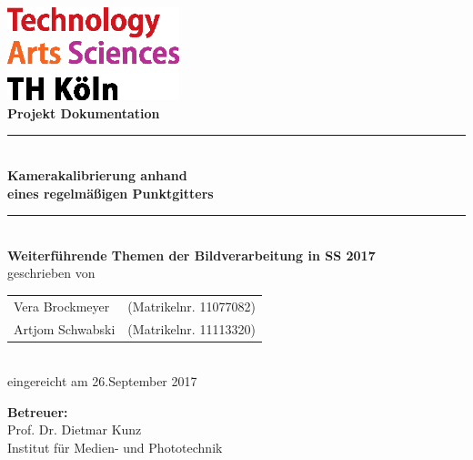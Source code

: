 \thispagestyle{empty}
\begin{center}
	\includegraphics[width=5cm]{Images/logo_TH}\\[12ex]
	{\Huge\textbf{Projekt Dokumentation}}\\[8ex]
	\rule{.8\textwidth}{.2pt}
	{\Large\\[1ex] \textbf{Kamerakalibrierung anhand \\ eines regelmäßigen Punktgitters }}\\
	\rule{.8\textwidth}{.2pt}\\[2ex]
	\textbf{Weiterführende Themen der Bildverarbeitung in SS 2017}\\[10ex]
	geschrieben von\\[2ex]
	\begin{tabular}{ll}
		Vera Brockmeyer &(Matrikelnr. 11077082)\\
		Artjom Schwabski &(Matrikelnr. 11113320)\\
	\end{tabular}\\[2ex]
	eingereicht am 26.September 2017\\[10ex]

		
\end{center}
\vfill
\begin{flushleft}
	{\bf Betreuer:}\\
	Prof. Dr. Dietmar Kunz\\
	Institut für Medien- und Phototechnik
\end{flushleft}
\newpage